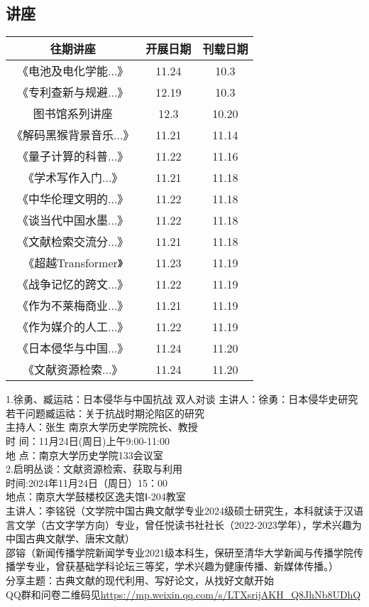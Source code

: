 \documentclass[letterpaper, 12pt]{article}
\begin{document}
\begin{multicols}{2}

\section{讲座}
\begin{tabular}{|c|c|c|}
    \hline
    往期讲座 & 开展日期 & 刊载日期\\
    \hline\hline
    《电池及电化学能...》 & 11.24 & 10.3\\
    《专利查新与规避...》 & 12.19 & 10.3\\
    图书馆系列讲座 & 12.3 & 10.20\\
    《解码黑猴背景音乐...》 & 11.21 & 11.14\\
    《量子计算的科普...》 & 11.22 & 11.16\\
    《学术写作入门...》& 11.21 & 11.18\\
    《中华伦理文明的...》& 11.22 & 11.18\\
    《谈当代中国水墨...》& 11.22 & 11.18\\
    《文献检索交流分...》 & 11.21 & 11.18\\
    《超越Transformer》 & 11.23 & 11.19\\
    《战争记忆的跨文...》 & 11.22 & 11.19\\
    《作为不莱梅商业...》 & 11.21 & 11.19\\
    《作为媒介的人工...》 & 11.22 & 11.19\\
    《日本侵华与中国...》 & 11.24 & 11.20\\
    《文献资源检索...》 & 11.24 & 11.20\\
    
    \hline
\end{tabular}

1.徐勇、臧运祜：日本侵华与中国抗战 双人对谈
主讲人：徐勇：日本侵华史研究若干问题臧运祜：关于抗战时期沦陷区的研究\\
主持人：张生 南京大学历史学院院长、教授\\
时 间：11月24日(周日)上午9:00-11:00\\
地 点：南京大学历史学院133会议室\\

2.启明丛谈：文献资源检索、获取与利用\\
时间:2024年11月24日（周日）15：00\\
地点：南京大学鼓楼校区逸夫馆Ⅰ-204教室\\
主讲人：李铭锐（文学院中国古典文献学专业2024级硕士研究生，本科就读于汉语言文学（古文字学方向）专业，曾任悦读书社社长（2022-2023学年），学术兴趣为中国古典文献学、唐宋文献）\\
邵镕（新闻传播学院新闻学专业2021级本科生，保研至清华大学新闻与传播学院传播学专业，曾获基础学科论坛三等奖，学术兴趣为健康传播、新媒体传播。）\\
分享主题：古典文献的现代利用、写好论文，从找好文献开始\\
QQ群和问卷二维码见\url{https://mp.weixin.qq.com/s/LTXsrijAKH_Q8JhNb8UDhQ}




\end{multicols}
\end{document}
